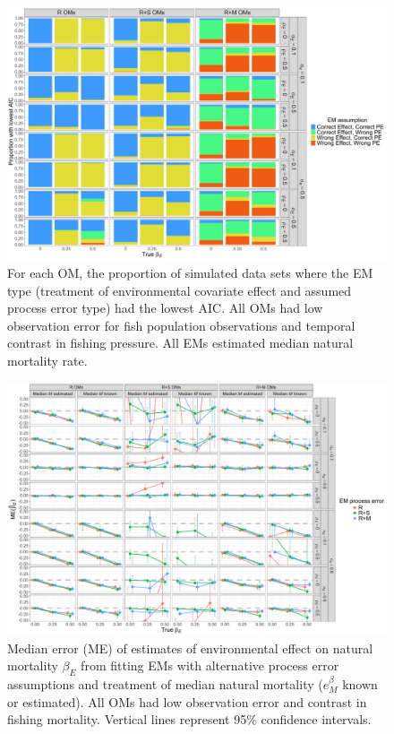 \documentclass[
  12pt,
]{article}
\begin{document}
\begin{landscape}
\begin{figure}
\begin{center}
\includegraphics[height = \textheight]{aic_main}
\end{center}
\caption{For each OM, the proportion of simulated data sets where the EM type (treatment of environmental covariate effect and  assumed process error type) had the lowest AIC. All OMs had low observation error for fish population observations and temporal contrast in fishing pressure. All EMs estimated median natural mortality rate.}\label{aic}
\end{figure}
\end{landscape}

\begin{landscape}
\begin{figure}
\begin{center}
\includegraphics[height = \textheight]{beta_E_bias_main}
\end{center}
\caption{Median error (ME) of estimates of environmental effect on natural mortality $\beta_E$ from fitting EMs with alternative process error assumptions and treatment of median natural mortality ($e^\beta_M$ known or estimated). All OMs had low observation error and contrast in fishing mortality. Vertical lines represent 95\% confidence intervals.}\label{beta_E_bias}
\end{figure}
\end{landscape}
\end{document}
